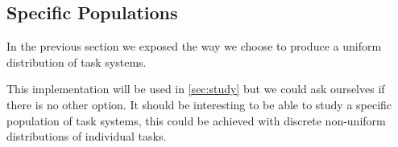 \subsection{Specific Populations}

In the previous section we exposed the way we choose to produce a uniform distribution of task systems.

This implementation will be used in \ref{sec:study} but we could ask ourselves if there is no other option.
It should be interesting to be able to study a specific population of task systems, this could be achieved with discrete non-uniform distributions of individual tasks.